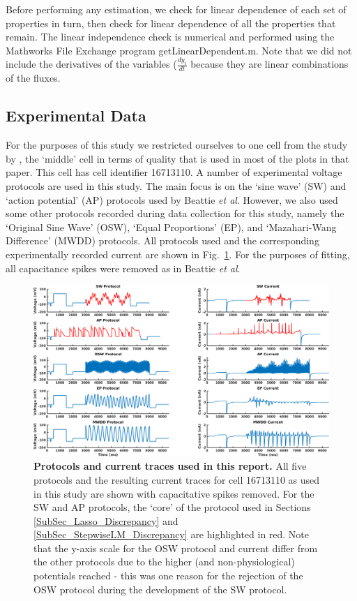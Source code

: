 \documentclass[11pt,a4paper,oneside]{article}
\begin{document}
{Before performing any estimation, we check for linear dependence of each set of properties in turn, then check for linear dependence of all the properties that remain. The linear independence check is numerical and performed using the Mathworks File Exchange program getLinearDependent.m. Note that we did not include the derivatives of the variables ($\frac{dy_i}{dt}$ because they are linear combinations of the fluxes.

\subsection{Experimental Data}
For the purposes of this study we restricted ourselves to one cell from the study by \cite{}, the `middle' cell in terms of quality that is used in most of the plots in that paper. This cell has cell identifier 16713110. A number of experimental voltage protocols are used in this study. The main focus is on the `sine wave' (SW) and `action potential' (AP) protocols used by Beattie \textit{et al}\cite{Beattie2018}. However, we also used some other protocols recorded during data collection for this study, namely the `Original Sine Wave' (OSW), `Equal Proportions' (EP), and `Mazahari-Wang Difference' (MWDD) protocols. All protocols used and the corresponding experimentally recorded current are shown in Fig.~\ref{Fig_Protocols}. For the purposes of fitting, all capacitance spikes were removed as in Beattie \textit{et al}\cite{Beattie2018}.

\begin{figure}[t]
\begin{center}
\includegraphics[scale=0.42]{Figures/Protocols.png}
\caption{\textbf{Protocols and current traces used in this report.} All five protocols and the resulting current traces for cell 16713110 as used in this study are shown with capacitative spikes removed. For the SW and AP protocols, the `core' of the protocol used in Sections \ref{SubSec_Lasso_Discrepancy} and \ref{SubSec_StepwiseLM_Discrepancy} are highlighted in red. Note that the y-axis scale for the OSW protocol and current differ from the other protocols due to the higher (and non-physiological) potentials reached - this was one reason for the rejection of the OSW protocol during the development of the SW protocol.}
\label{Fig_Protocols}
\end{center}
\end{figure}

}
\end{document}
